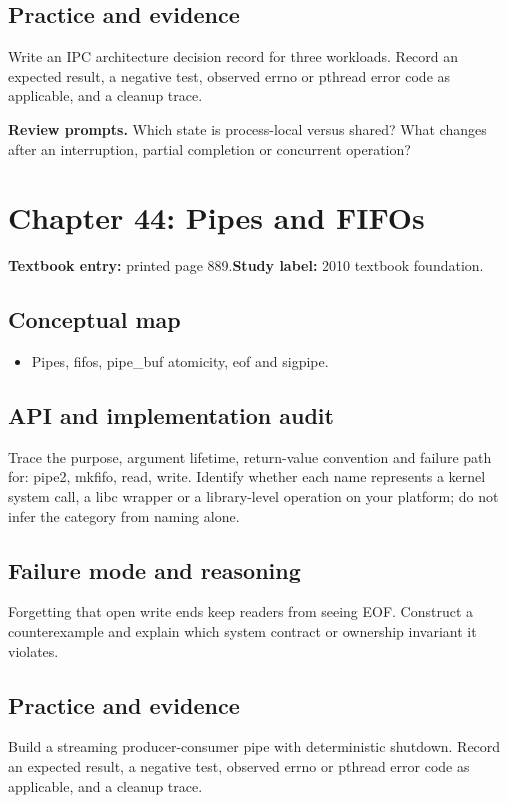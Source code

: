 \documentclass[11pt,letterpaper,oneside]{report}
\begin{document}
\subsection{Practice and evidence}
Write an IPC architecture decision record for three workloads. Record an expected result, a negative test, observed errno or pthread error code as applicable, and a cleanup trace.

\textbf{Review prompts.} Which state is process-local versus shared? What changes after an interruption, partial completion or concurrent operation?

\section{Chapter 44: Pipes and FIFOs}
\textbf{Textbook entry:} printed page 889.\quad \textbf{Study label:} 2010 textbook foundation.

\subsection{Conceptual map}
\begin{itemize}
\item Pipes, fifos, pipe\_buf atomicity, eof and sigpipe.
\end{itemize}
\subsection{API and implementation audit}
Trace the purpose, argument lifetime, return-value convention and failure path for: pipe2, mkfifo, read, write. Identify whether each name represents a kernel system call, a libc wrapper or a library-level operation on your platform; do not infer the category from naming alone.

\subsection{Failure mode and reasoning}
Forgetting that open write ends keep readers from seeing EOF. Construct a counterexample and explain which system contract or ownership invariant it violates.

\subsection{Practice and evidence}
Build a streaming producer-consumer pipe with deterministic shutdown. Record an expected result, a negative test, observed errno or pthread error code as applicable, and a cleanup trace.
\end{document}
